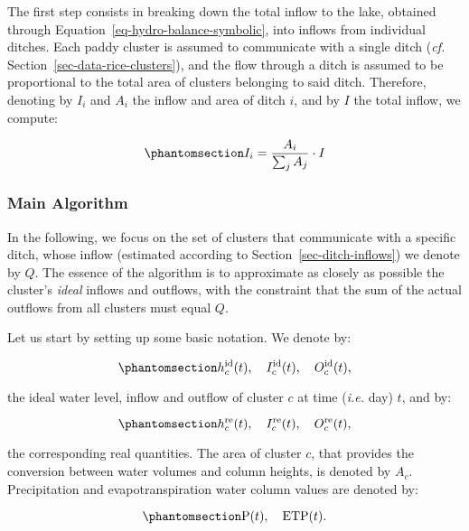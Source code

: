 \documentclass[
  letterpaper,
  DIV=11,
  numbers=noendperiod]{scrreprt}
\begin{document}
The first step consists in breaking down the total inflow to the lake,
obtained through Equation~\ref{eq-hydro-balance-symbolic}, into inflows
from individual ditches. Each paddy cluster is assumed to communicate
with a single ditch (\emph{cf.} Section~\ref{sec-data-rice-clusters}),
and the flow through a ditch is assumed to be proportional to the total
area of clusters belonging to said ditch. Therefore, denoting by \(I_i\)
and \(A_i\) the inflow and area of ditch \(i\), and by \(I\) the total
inflow, we compute:

\begin{equation}\phantomsection\label{eq-ditch-inflow}{
I_i = \frac{A_i}{\sum _j A_j} \cdot I 
}\end{equation}

\subsubsection{Main Algorithm}\label{main-algorithm}

In the following, we focus on the set of clusters that communicate with
a specific ditch, whose inflow (estimated according to
Section~\ref{sec-ditch-inflows}) we denote by \(Q\). The essence of the
algorithm is to approximate as closely as possible the cluster's
\emph{ideal} inflows and outflows, with the constraint that the sum of
the actual outflows from all clusters must equal \(Q\).

Let us start by setting up some basic notation. We denote by:

\begin{equation}\phantomsection\label{eq-hbl-ideal-qts}{
h_c ^\text{id}(t),\quad I_c ^\text{id}(t),\quad O_c ^\text{id}(t),
}\end{equation}

the ideal water level, inflow and outflow of cluster \(c\) at time
(\emph{i.e.} day) \(t\), and by:

\begin{equation}\phantomsection\label{eq-hbl-real-qts}{
h_c ^\text{re}(t),\quad I_c ^\text{re}(t),\quad O_c ^\text{re}(t),
}\end{equation}

the corresponding real quantities. The area of cluster \(c\), that
provides the conversion between water volumes and column heights, is
denoted by \(A_c\). Precipitation and evapotranspiration water column
values are denoted by:

\begin{equation}\phantomsection\label{eq-hbl-petp}{
\text{P}(t),\quad \text{ETP}(t).
}\end{equation}
\end{document}
